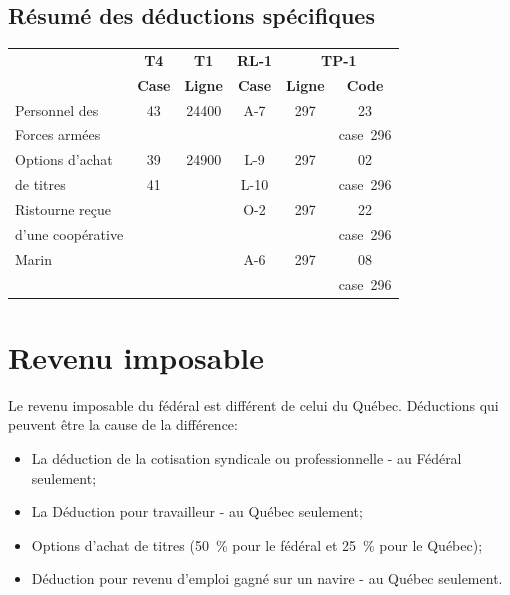 \subsection{Résumé des déductions spécifiques}
\begin{center}
	\begin{tabular}{|l|c|c|c|c|c|}
		\hline
		                  &  \textbf{T4}  &  \textbf{T1}   & \textbf{RL-1} & \multicolumn{2}{c|}{\textbf{TP-1}} \\ \cline{5-6}
		                  & \textbf{Case} & \textbf{Ligne} & \textbf{Case} & \textbf{Ligne} &   \textbf{Code}   \\ \hline
		Personnel des     &      43       &     24400      &      A-7      &      297       &        23         \\
		Forces armées     &               &                &               &                &     case~296      \\ \hline
		Options d'achat   &      39       &     24900      &      L-9      &      297       &        02         \\
		de titres         &      41       &                &     L-10      &                &     case~296      \\ \hline
		Ristourne reçue   &               &                &      O-2      &      297       &        22         \\
		d'une coopérative &               &                &               &                &     case~296      \\ \hline
		Marin             &               &                &      A-6      &      297       &        08         \\
		                  &               &                &               &                &     case~296      \\ \hline
	\end{tabular}
\end{center}




\section{Revenu imposable}
Le revenu imposable du fédéral est différent de celui du Québec. Déductions qui peuvent être la cause de la différence:

\begin{itemize}
	\item La déduction de la cotisation syndicale ou professionnelle - au Fédéral seulement;
	\item La \og Déduction pour travailleur \fg{} - au Québec seulement;
	\item Options d'achat de titres (50~\% pour le fédéral et 25~\% pour le Québec); 
	\item Déduction pour revenu d'emploi gagné sur un navire - au Québec seulement.
\end{itemize}



